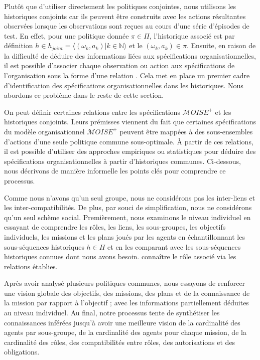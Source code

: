 \documentclass[contribution]{jfsma}
\newcounter{relation}
\begin{document}
Plutôt que d'utiliser directement les politiques conjointes, nous utilisons les historiques conjoints car ils peuvent être construits avec les actions résultantes observées lorsque les observations sont reçues au cours d'une série d'épisodes de test. En effet, pour une politique donnée $\pi \in \Pi$, l'historique associé est par définition $h \in h_{joint} = \langle(\omega_k,a_k) | k \in \mathbb{N}\rangle$ et le $(\omega_k,a_k) \in \pi$.
Ensuite, en raison de la difficulté de déduire des informations liées aux spécifications organisationnelles, il est possible d'associer chaque observation ou action aux spécifications de l'organisation sous la forme d'une relation . Cela met en place un premier cadre d’identification des spécifications organisationnelles dans les historiques. Nous abordons ce problème dans le reste de cette section.

On peut définir certaines relations entre les spécifications $\mathcal{M}OISE^+$ et les historiques conjoints. Leurs prémisses viennent du fait que certaines spécifications du modèle organisationnel $\mathcal{M}OISE^+$ peuvent être mappées à des sous-ensembles d'actions d'une seule politique commune sous-optimale.
À partir de ces relations, il est possible d’utiliser des approches empiriques ou statistiques pour déduire des spécifications organisationnelles à partir d’historiques communes. Ci-dessous, nous décrivons de manière informelle les points clés pour comprendre ce processus.

Comme nous n’avons qu’un seul groupe, nous ne considérons pas les inter-liens et les inter-compatibilités. De plus, par souci de simplification, nous ne considérons qu’un seul schème social.
Premièrement, nous examinons le niveau individuel en essayant de comprendre les rôles, les liens, les sous-groupes, les objectifs individuels, les missions et les plans joués par les agents en échantillonnant les sous-séquences historiques $h \in H$ et en les comparant avec les sous-séquences historiques connues dont nous avons besoin. connaître le rôle associé via les relations établies.

Après avoir analysé plusieurs politiques communes, nous essayons de renforcer une vision globale des objectifs, des missions, des plans et de la connaissance de la mission par rapport à l'objectif ; avec les informations partiellement déduites au niveau individuel.
Au final, notre processus tente de synthétiser les connaissances inférées jusqu'à avoir une meilleure vision de la cardinalité des agents par sous-groupe, de la cardinalité des agents pour chaque mission, de la cardinalité des rôles, des compatibilités entre rôles, des autorisations et des obligations.
\end{document}
